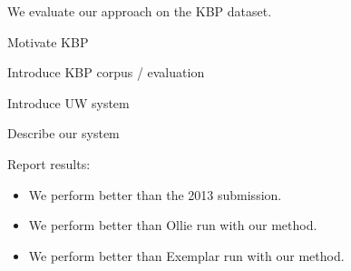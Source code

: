 
We evaluate our approach on the KBP dataset.

Motivate KBP

Introduce KBP corpus / evaluation

Introduce UW system

Describe our system

Report results:
\begin{itemize}
  \item We perform better than the 2013 submission.
  \item We perform better than Ollie run with our method.
  \item We perform better than Exemplar run with our method.
\end{itemize}
